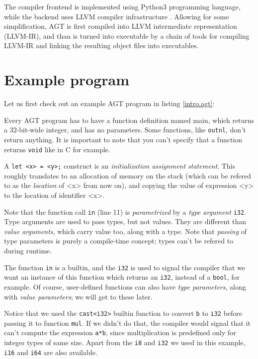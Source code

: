 \documentclass[times, utf8, diplomski]{fer}
\theoremstyle{definition}
\newcommand{\agtcode}[3]{
    
}
\begin{document}
The compiler frontend is implemented using Python3 programming language,
while the backend uses LLVM compiler infrastructure \citep{c_llvm_lattner}.
Allowing for some simplification, AGT is first compiled into LLVM intermediate representation (LLVM-IR),
and than is turned into executable by a chain of tools for compiling LLVM-IR and 
linking the resulting object files into executables.

\section{Example program}

Let us first check out an example AGT program in listing \ref{intro.agt}:

\agtcode{\resdir/programs/intro.agt}{intro.agt}{Example AGT program}

Every AGT program has to have a function definition named main, 
which returns a 32-bit-wide integer,
and has no parameters.
Some functions, like \texttt{outnl}, don't return anything. 
It is important to note that you can't
specify that a function returns \texttt{void} like in C for example.

A \texttt{let <x> = <y>;} construct is an \textit{initialization assignment statement}.
This roughly translates to an allocation of memory on the stack (which can be refered
to as the \textit{location} of <x> from now on), and copying the value of expression <y>
to the location of identifier <x>.

Note that the function call \texttt{in} (line 11) is \textit{parametrized} 
by a \textit{type argument} \texttt{i32}.
Type arguments are used to pass types, but not values. 
They are different than \textit{value arguments}, which carry value too, along with a type.
Note that \textit{passing} of type parameters is purely a compile-time concept;
types can't be refered to during runtime.


The function \texttt{in} is a builtin, and the \texttt{i32} is used to signal the compiler
that we want an instance of this function which returns an \texttt{i32}, 
instead of a \texttt{bool}, for example. 
Of course, user-defined functions can also have \textit{type parameters}, along with \textit{value parameters};
we will get to these later.

Notice that we used the \texttt{cast<i32>} builtin function to convert \texttt{b} to \texttt{i32}
before passing it to function \texttt{mul}. If we didn't do that, the compiler would signal that it can't
compute the expression \texttt{a*b}, since multiplication is predefined only for integer types of same size.
Apart from the \texttt{i8} and \texttt{i32} we used in this example, \texttt{i16} and \texttt{i64} are also
available.
\end{document}

